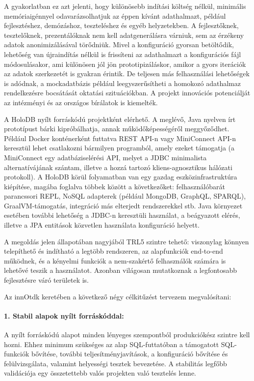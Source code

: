 \documentclass[12pt]{article}
\begin{document}
A gyakorlatban ez azt jelenti, hogy különösebb indítási költség nélkül, minimális memóriaigénnyel odavarázsolhatjuk az éppen kívánt adathalmazt, például fejlesztéshez, demózáshoz, teszteléshez és egyéb helyzetekben.
A fejlesztőknek, tesztelőknek, prezentálóknak nem kell adatgenerálásra várniuk, sem az érzékeny adatok anonimizálásával törődniük.
Mivel a konfiguráció gyorsan betöltődik, lehetőség van újraindítás nélkül is frissíteni az adathalmazt a konfigurációs fájl módosulásakor, ami különösen jól jön prototipizáláskor, amikor a gyors iterációk az adatok szerkezetét is gyakran érintik.
De teljesen más felhasználási lehetőségek is adódnak, a mockadatbázis például leegyszerűsítheti a homokozó adathalmaz rendelkezésre bocsátását oktatási szituációkban.
A projekt innovációs potenciálját az intézményi és az országos bírálatok is kiemelték.

A HoloDB nyílt forráskódú projektként elérhető.
A meglévő, Java nyelven írt prototípust bárki kipróbálhatja, annak működőképességéről meggyőződhet.
Például Docker konténerként futtatva REST API-n vagy MiniConnect API-n keresztül lehet csatlakozni bármilyen programból, amely ezeket támogatja
(a MiniConnect egy adatbáziselérési API, melyet a JDBC minimalista alternatívájának szántam, illetve a hozzá tartozó kliens-agnosztikus hálózati protokoll).
A HoloDB körül folyamatban van egy gazdag eszközinfrastruktúra kiépítése, magába foglalva többek között a következőket: felhasználóbarát parancssori REPL, NoSQL adapterek (például MongoDB, GraphQL, SPARQL), GraalVM-támogatás, integráció más elterjedt rendszerekkel stb.
Java környezet esetében további lehetőség a JDBC-n keresztüli használat,
a beágyazott elérés, illetve a JPA entitások közvetlen használata konfiguráció helyett.

A megoldás jelen állapotában nagyjából TRL5 szintre tehető:
viszonylag könnyen telepíthető és indítható a legtöbb rendszeren,
az alapfunkciók end-to-end működnek,
és a kényelmi funkciók a nem-szakértő felhasználók számára is lehetővé teszik a használatot.
Azonban világosan mutatkoznak a legfontosabb fejlesztésre váró területek is.

Az innOtdk keretében a következő négy célkitűzést tervezem megvalósítani:

\paragraph{1. Stabil alapok nyílt forráskóddal:}
A nyílt forráskódú alapot minden lényeges szempontból produkciókész szintre kell hozni.
Ehhez minimum szükséges az alap SQL-futtatóban a támogatott SQL-funkciók bővítése,
további teljesítményjavítások,
a konfiguráció bővítése és felülvizsgálata,
valamint helyességi tesztek bevezetése.
A stabilitás legfőbb validációja egy összetettebb valós projekten való tesztelés lenne.
\end{document}
